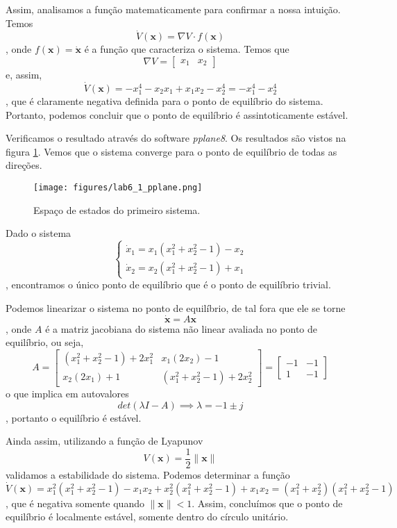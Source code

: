 \documentclass[a4paper]{report}
\begin{document}
Assim, analisamos a função matematicamente para confirmar a nossa intuição. Temos \[
\dot{V}\left( \bm{x} \right)  = \nabla V \cdot f\left( \bm{x} \right)
\], onde $f( \bm{x}) = \dot{\bm{x}}$ é a função que caracteriza o sistema. Temos que \[
\nabla V = \begin{bmatrix} x_1 & x_2 \end{bmatrix} 
\] e, assim, \[
\dot{V}\left( \bm{x} \right) = -x_1^{4} - x_2x_1 + x_1x_2 - x_2^{4} = -x_1^{4} - x_2^{4}
\], que é claramente negativa definida para o ponto de equilíbrio do sistema. Portanto, podemos concluir que o ponto de equilíbrio é assintoticamente estável.

Verificamos o resultado através do software \emph{pplane8}. Os resultados são vistos na figura \ref{fig:figures-lab6_1_pplane-png}. Vemos que o sistema converge para o ponto de equilíbrio de todas as direções.

\begin{figure}[H]
    \centering
    \texttt{[image: figures/lab6\_1\_pplane.png]}
    \caption{Espaço de estados do primeiro sistema.}
    \label{fig:figures-lab6_1_pplane-png}
\end{figure}


Dado o sistema \[
\begin{cases}
    \dot{x}_1 = x_1\left( x_1^2+x_2^2-1 \right) -x_2 \\
    \dot{x}_2 = x_2\left( x_1^2+x_2^2 -1 \right) +x_1
\end{cases}
\], encontramos o único ponto de equilíbrio que é o ponto de equilíbrio trivial.

Podemos linearizar o sistema no ponto de equilíbrio, de tal fora que ele se torne \[
\bm{\dot{x}} = A\bm{x}
\], onde $A$ é a matriz jacobiana do sistema não linear avaliada no ponto de equilíbrio, ou seja, \[
A = \begin{bmatrix} \left( x_1^2+x_2^2 -1 \right) + 2x_1^2 & x_1\left( 2x_2 \right)  -1 \\ x_2\left( 2x_1 \right) +1 & \left( x_1^2+x_2^2 -1 \right) + 2x_2^2  \end{bmatrix} = \begin{bmatrix} -1 & -1 \\ 1 & -1 \end{bmatrix} 
\] o que implica em autovalores \[
det\left( \lambda I - A \right) \implies \lambda = -1 \pm j
\], portanto o equilíbrio é estável.

Ainda assim, utilizando a função de Lyapunov \[
V\left( \bm{x} \right) =\frac{1}{2} \|\bm{x}\|
\] validamos a estabilidade do sistema. Podemos determinar a função \[
\dot{V}\left( \bm{x} \right) = x_1^2\left( x_1^2+x_2^2 -1 \right) -x_1x_2 + x_2^2\left( x_1^2+x_2^2 -1 \right) + x_1x_2 = \left( x_1^2 + x_2^2 \right) \left( x_1^2+x_2^2 -1 \right)
\], que é negativa somente quando $\|\bm{x}\|<1$. Assim, concluímos que o ponto de equilíbrio é localmente estável, somente dentro do círculo unitário.
\end{document}
